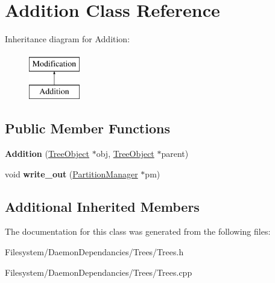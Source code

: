 \hypertarget{classAddition}{}\section{Addition Class Reference}
\label{classAddition}
Inheritance diagram for Addition\+:\begin{figure}[H]
\begin{center}
\leavevmode
\includegraphics[height=2.000000cm]{classAddition}
\end{center}
\end{figure}
\subsection*{Public Member Functions}
\begin{DoxyCompactItemize}
\item 
\mbox{\label{classAddition_a0bcd6cd605c0e90a834339a1feb20901}} 
{\bfseries Addition} (\mbox{\hyperlink{classTreeObject}{Tree\+Object}} $\ast$obj, \mbox{\hyperlink{classTreeObject}{Tree\+Object}} $\ast$parent)
\item 
\mbox{\label{classAddition_a08cd2dae96a62c80d6fe62339232fbca}} 
void {\bfseries write\+\_\+out} (\mbox{\hyperlink{classPartitionManager}{Partition\+Manager}} $\ast$pm)
\end{DoxyCompactItemize}
\subsection*{Additional Inherited Members}


The documentation for this class was generated from the following files\+:\begin{DoxyCompactItemize}
\item 
Filesystem/\+Daemon\+Dependancies/\+Trees/Trees.\+h\item 
Filesystem/\+Daemon\+Dependancies/\+Trees/Trees.\+cpp\end{DoxyCompactItemize}
